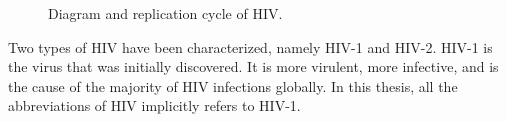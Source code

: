 \begin{figure}
\centering
{}
\caption{Diagram and replication cycle of HIV.}
\label{fig:HIVDiagramAndReplicationCycle}
\end{figure}

Two types of HIV have been characterized, namely HIV-1 and HIV-2. HIV-1 is the virus that was initially discovered. It is more virulent, more infective, and is the cause of the majority of HIV infections globally. In this thesis, all the abbreviations of HIV implicitly refers to HIV-1.

